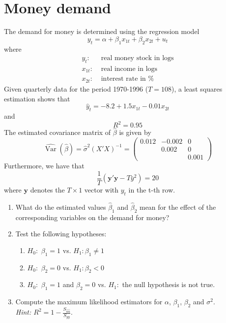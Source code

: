 \documentclass{article}
\begin{document}
\newpage
\section{Money demand}
The demand for money is determined using the regression model
$$ y_t = \alpha + \beta_1 x_{1t} + \beta_2 x_{2t} + u_t$$
where
\begin{align*}
	y_t:    & \text{ real money stock in logs}\\
	x_{1t}: & \text{ real income in logs}\\
	x_{2t}: & \text{ interest rate in \%}
\end{align*} 
Given quarterly data for the period 1970-1996 ($T=108$), a least squares estimation shows that
$$\hat{y}_t = -8.2 +1.5x_{1t} - 0.01 x_{2t}$$
and $$R^2 = 0.95$$
The estimated covariance matrix of $\hat{\beta}$ is given by
$$\widehat{\operatorname{Var}}(\hat{\beta}) = \hat{\sigma}^2 (X'X)^{-1} = 
\begin{pmatrix} 
0.012 & -0.002 & 0\\
& 0.002  & 0\\
&        & 0.001			
\end{pmatrix}$$
Furthermore, we have that $$\frac{1}{T} (\mathbf{y}'\mathbf{y} - T \bar{y}^2)=20$$ where $\mathbf{y}$ denotes the $T\times1$ vector with $y_t$ in the t-th row.
\begin{enumerate}[label=(\alph*)]
	\item What do the estimated values $\hat{\beta}_1$ and $\hat{\beta}_2$ mean for the effect of the corresponding variables on the demand for money?
	\item Test the following hypotheses:
	\begin{enumerate}[label=(\roman*)]
		\item $H_0:$ $\beta_1=1$ vs. $H_1: \beta_1 \neq1$
		\item $H_0:$ $\beta_2=0$ vs. $H_1: \beta_2 <0$
		\item $H_0:$ $\beta_1=1$ and $\beta_2=0$ vs. $H_1:$ the null hypothesis is not true.
	\end{enumerate}
	\item Compute the maximum likelihood estimators for $\alpha$, $\beta_1$, $\beta_2$ and $\sigma^2$.\\
	\textit{Hint: $R^2=1-\frac{S_{\hat{u}\hat{u}}}{S_{yy}}$}.
	
\end{enumerate}
\newpage
\end{document}

